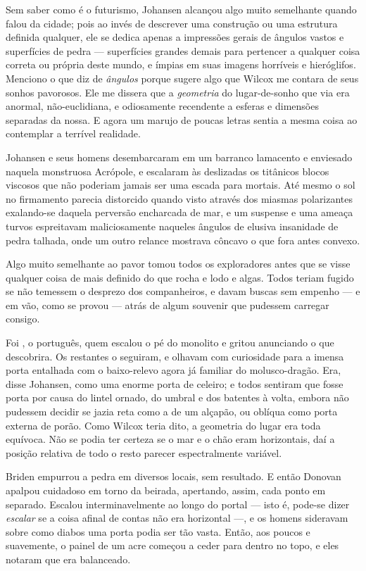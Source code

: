 \begin{pages}
\begin{Rightside}
Sem saber como é o futurismo, Johansen alcançou algo muito semelhante
quando falou da cidade; pois ao invés de descrever uma construção ou uma
estrutura definida qualquer, ele se dedica apenas a impressões gerais de
ângulos vastos e superfícies de pedra --- superfícies grandes demais
para pertencer a qualquer coisa correta ou própria deste mundo, e ímpias
em suas imagens horríveis e hieróglifos. Menciono o que diz de
\emph{ângulos} porque sugere algo que Wilcox me contara de seus sonhos
pavorosos. Ele me dissera que a \emph{geometria} do lugar-de-sonho que
via era anormal, não-euclidiana, e odiosamente recendente a esferas e
dimensões separadas da nossa. E agora um marujo de poucas letras sentia
a mesma coisa ao contemplar a terrível realidade.

Johansen e seus homens desembarcaram em um barranco lamacento e
enviesado naquela monstruosa Acrópole, e escalaram às deslizadas os
titânicos blocos viscosos que não poderiam jamais ser uma escada para
mortais. Até mesmo o sol no firmamento parecia distorcido quando visto
através dos miasmas polarizantes exalando-se daquela perversão
encharcada de mar, e um suspense e uma ameaça turvos espreitavam
maliciosamente naqueles ângulos de elusiva insanidade de pedra talhada,
onde um outro relance mostrava côncavo o que fora antes convexo.

Algo muito semelhante ao pavor tomou todos os exploradores antes que se
visse qualquer coisa de mais definido do que rocha e lodo e algas. Todos
teriam fugido se não temessem o desprezo dos companheiros, e davam
buscas sem empenho --- e em vão, como se provou --- atrás de algum souvenir que pudessem carregar consigo.

Foi , o português, quem escalou o pé do monolito e
gritou anunciando o que descobrira. Os restantes o seguiram, e olhavam
com curiosidade para a imensa porta entalhada com o baixo-relevo agora
já familiar do molusco-dragão. Era, disse Johansen, como uma enorme
porta de celeiro; e todos sentiram que fosse porta por causa do lintel
ornado, do umbral e dos batentes à volta, embora não pudessem decidir se
jazia reta como a de um alçapão, ou oblíqua como porta externa de porão.
Como Wilcox teria dito, a geometria do lugar era toda equívoca. Não se
podia ter certeza se o mar e o chão eram horizontais, daí a posição
relativa de todo o resto parecer espectralmente variável.

Briden empurrou a pedra em diversos locais, sem resultado. E então
Donovan apalpou cuidadoso em torno da beirada, apertando, assim, cada
ponto em separado. Escalou interminavelmente ao longo do portal --- isto
é, pode-se dizer \emph{escalar} se a coisa afinal de contas não era
horizontal ---, e os homens sideravam sobre como diabos uma porta podia
ser tão vasta. Então, aos poucos e suavemente, o painel de um acre
começou a ceder para dentro no topo, e eles notaram que era balanceado.


\end{Rightside}
\end{pages}
